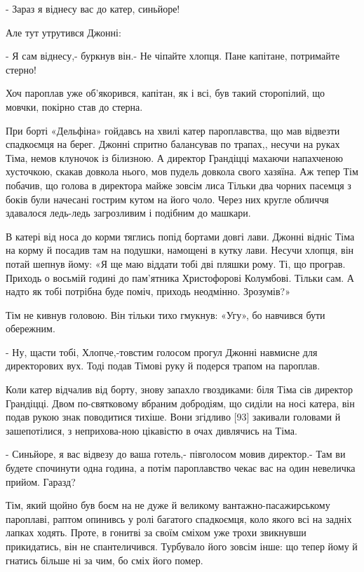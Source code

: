 - Зараз я віднесу вас до катер, синьйоре!

Але тут утрутився Джонні:

- Я сам віднесу,- буркнув він.- Не чіпайте хлопця. Пане капітане, потримайте стерно!

Хоч пароплав уже об'якорився, капітан, як і всі, був такий сторопілий, що мовчки, покірно став до стерна.

При борті «Дельфіна» гойдавсь на хвилі катер пароплавства, що мав відвезти спадкоємця на берег. Джонні спритно балансував по трапах,, несучи на руках Тіма, немов клуночок із білизною. А директор Грандіцці махаючи напахченою хусточкою, скакав довкола нього, мов пудель довкола свого хазяїна. Аж тепер Тім побачив, що голова в директора майже зовсім лиса Тільки два чорних пасемця з боків були начесані гострим кутом на його чоло. Через них кругле обличчя здавалося ледь-ледь загрозливим і подібним до машкари.

В катері від носа до корми тяглись попід бортами довгі лави. Джонні відніс Тіма на корму й посадив там на подушки, намощені в кутку лави. Несучи хлопця, він потай шепнув йому: «Я ще маю віддати тобі дві пляшки рому. Ті, що програв. Приходь о восьмій годині до пам'ятника Христофорові Колумбові. Тільки сам. А надто як тобі потрібна буде поміч, приходь неодмінно. Зрозумів?»

Тім не кивнув головою. Він тільки тихо гмукнув: «Угу», бо навчився бути обережним.

- Ну, щасти тобі, Хлопче,-товстим голосом прогул Джонні навмисне для директорових вух. Тоді подав Тімові руку й подерся трапом на пароплав.

Коли катер відчалив від борту, знову запахло гвоздиками: біля Тіма сів директор Грандіцці. Двом по-святковому вбраним добродіям, що сиділи на носі катера, він подав рукою знак поводитися тихіше. Вони згідливо [93] закивали головами й зашепотілися, з неприхова-ною цікавістю в очах дивлячись на Тіма.

- Синьйоре, я вас відвезу до ваша готель,- півголосом мовив директор.- Там ви будете спочинути одна година, а потім пароплавство чекає вас на один невеличка прийом. Гаразд?

Тім, який щойно був боєм на не дуже й великому вантажно-пасажирському пароплаві, раптом опинивсь у ролі багатого спадкоємця, коло якого всі на задніх лапках ходять. Проте, в гонитві за своїм сміхом уже трохи звикнувши прикидатись, він не спантеличився. Турбувало його зовсім інше: що тепер йому й гнатись більше ні за чим, бо сміх його помер.

